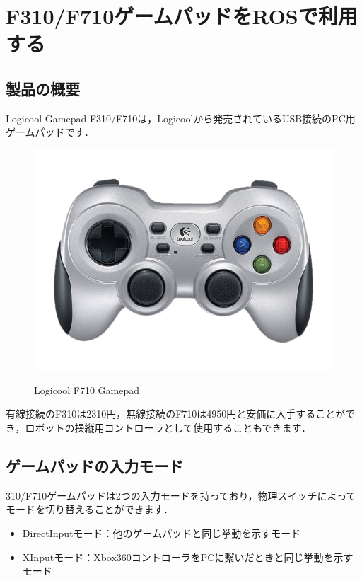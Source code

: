 \documentclass[{../../master}]{subfiles}
\begin{document}
\section{F310/F710ゲームパッドをROSで利用する}

\subsection{製品の概要}

  Logicool Gamepad F310/F710は，Logicoolから発売されているUSB接続のPC用ゲームパッドです．

  \begin{figure}[ht]
    \centering
    \includegraphics[width=65truemm, clip]{images/f710_overview.png}
    \label{fig:f710_overview}
    \caption{Logicool F710 Gamepad}
  \end{figure}

  有線接続のF310は2310円，無線接続のF710は4950円と安価に入手することができ，ロボットの操縦用コントローラとして使用することもできます．

\subsection{ゲームパッドの入力モード}

  310/F710ゲームパッドは2つの入力モードを持っており，物理スイッチによってモードを切り替えることができます．

  \begin{itemize}
    \item \textsf{DirectInput}モード：他のゲームパッドと同じ挙動を示すモード
    \item \textsf{XInput}モード：Xbox360コントローラをPCに繋いだときと同じ挙動を示すモード
  \end{itemize}
\end{document}
